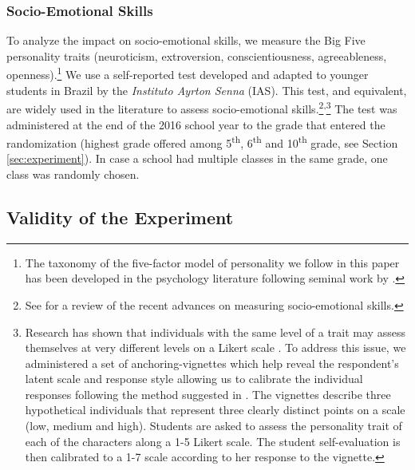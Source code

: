 \documentclass[11pt,a4paper]{article}
\begin{document}
\subsubsection*{Socio-Emotional Skills} 
To analyze the impact on socio-emotional skills, we measure the Big Five personality traits (neuroticism, extroversion, conscientiousness, agreeableness, openness).\footnote{The taxonomy of the five-factor model of personality we follow in this paper has been developed in the psychology literature following seminal work by \citet{fiske1949consistency}.} We use a self-reported test developed and adapted to younger students in Brazil by the \textit{Instituto Ayrton Senna} (IAS). This test, and equivalent, are widely used in the literature to assess socio-emotional skills.\footnote{See \cite{kautz2014fostering} for a review of the recent advances on measuring socio-emotional skills.}\textsuperscript{,}\footnote{Research has shown that individuals with the same level of a trait may assess themselves at very different levels on a Likert scale \citep{primi2016anchor}. To address this issue, we administered a set of anchoring-vignettes which help reveal the respondent's latent scale and response style allowing us to calibrate the individual responses following the method suggested in \cite{primi2016anchor}. The vignettes describe three hypothetical individuals that represent three clearly distinct points on a scale (low, medium and high). Students are asked to assess the personality trait of each of the characters along a 1-5 Likert scale. The student self-evaluation is then calibrated to a 1-7 scale according to her response to the vignette.} The test was administered at the end of the 2016 school year to the grade that entered the randomization (highest grade offered among 5\textsuperscript{th}, 6\textsuperscript{th} and 10\textsuperscript{th} grade, see Section \ref{sec:experiment}). In case a school had multiple classes in the same grade, one class was randomly chosen.  


\subsection{Validity of the Experiment} \label{sec:balance}
\end{document}
